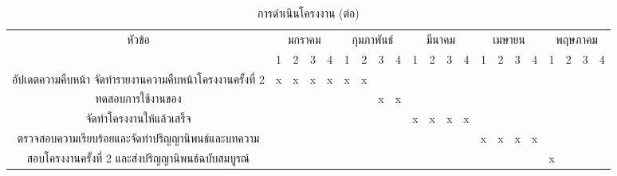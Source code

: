 \begin{landscape}
\begin{table}[h]
        \begin{tabular}{|*{21}{c|}}
        \hline 
         \multirow {2}{*}{หัวข้อ} & \multicolumn{4}{c|}{มกราคม} & \multicolumn{4}{c|}{กุมภาพันธ์} & \multicolumn{4}{c|}{มีนาคม} & \multicolumn{4}{c|}{เมษายน} & \multicolumn{4}{c|}{พฤษภาคม} \\\cline {2-21}
        & 1 & 2 & 3 & 4 & 1 & 2 & 3 & 4 &  1 & 2 & 3 & 4 & 1 & 2 & 3 & 4 & 1 & 2 & 3 & 4  \\\hline 
         อัปเดตความคืบหน้า จัดทำรายงานความคืบหน้าโครงงานครั้งที่ 2  & x & x & x & x & x & x &  &  &  &  &  &  &    &  &  &  &  &  &  &  \\\hline 
         ทดสอบการใช้งานของ  &  &  &  &  &  &  & x & x &  &  &  &  &  &  &  &  &  &  &  &    \\\hline 
         จัดทำโครงงานให้แล้วเสร็จ  &  &  &  &  &  &  &  &  & x & x & x & x &  &  &  &  &  &  &  &  \\\hline 
         ตรวจสอบความเรียบร้อยและจัดทำปริญญานิพนธ์และบทความ &  &  &  &  &  &   &   &   &  &  &  &  & x & x & x & x &  &  &  & \\\hline 
        สอบโครงงานครั้งที่ 2 และส่งปริญญานิพนธ์ฉบับสมบูรณ์ &  &  &  &  &  &  &  &  &  &  &  &  &  &  &  &  & x &  &  &   \\\hline 
    
        \end{tabular}
        \caption{การดำเนินโครงงาน (ต่อ)}
        \label{tab:my_label}
    \end{table}


    



\end{landscape}

